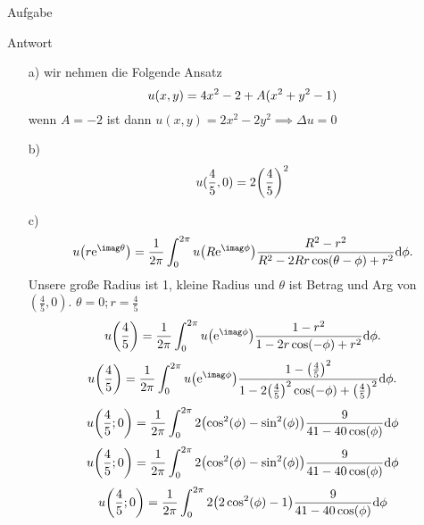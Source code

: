\documentclass{scrartcl}
\begin{document}
\begin{section}{Aufgabe}
      \begin{subsection}{Antwort}
\begin{itemize}
\item[a)]
wir nehmen die Folgende Ansatz 
\[u\qty(x,y)=4x^2-2+A(x^2+y^2-1)\]
wenn $A=-2$ ist dann $u(x,y)=2x^2-2y^2\implies \Delta u =0$
\item[b)] 
\[u(\frac{4}{5},0)=2\qty(\frac{4}{5})^2\] 
\item[c)]  
\[u\qty(r \mathrm{e}^{\imag \theta})=\frac{1}{2\pi}\int_0^{2\pi} u\qty(R \mathrm{e}^{\imag \phi}) \frac{R^2-r^2}{R^2 -2R r \cos(\theta-\phi)+r^2}\dd \phi. \]
Unsere große Radius ist 1, kleine Radius und $\theta$ ist Betrag und Arg von $(\frac{4}{5},0)$. $\theta=0;r=\frac{4}{5}$
\[u\qty(\frac{4}{5})=\frac{1}{2\pi}\int_0^{2\pi} u\qty(\mathrm{e}^{\imag \phi}) \frac{1-r^2}{1 -2 r \cos(-\phi)+r^2}\dd \phi. \]
\[u\qty(\frac{4}{5})=\frac{1}{2\pi}\int_0^{2\pi} u\qty(\mathrm{e}^{\imag \phi}) \frac{1-\qty(\frac{4}{5})^2}{1 -2 \qty(\frac{4}{5})^2 \cos(-\phi)+\qty(\frac{4}{5})^2}\dd \phi. \]
\[u\qty(\frac{4}{5};0)=\frac{1}{2\pi}\int_0^{2\pi}2\qty(\cos[2](\phi)-\sin[2](\phi))\frac{9}{41-40 \cos (\phi )}\dd\phi \]
\[u\qty(\frac{4}{5};0)=\frac{1}{2\pi}\int_0^{2\pi}2\qty(\cos[2](\phi)-\sin[2](\phi))\frac{9}{41-40 \cos (\phi )} \dd\phi\]
\[u\qty(\frac{4}{5};0)=\frac{1}{2\pi}\int_0^{2\pi}2\qty(2\cos[2](\phi)-1)\frac{9}{41-40 \cos (\phi )}\dd\phi \]


\end{itemize}
\end{subsection}
\end{section}
\end{document}
